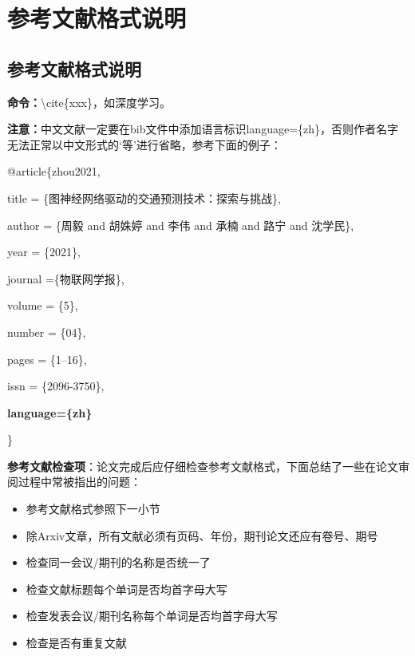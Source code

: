  \setlength{\baselineskip}{20pt}
\chapter{参考文献格式说明}
\label{cha:chap3}


\section{参考文献格式说明}

\textbf{命令：}\textbackslash cite\{xxx\}，如深度学习\cite{lecunDeepLearning2015}。

\textbf{注意：}中文文献一定要在bib文件中添加语言标识language=\{zh\}，否则作者名字无法正常以中文形式的‘等’进行省略，参考下面的例子\cite{zhou2021}：

@article\{zhou2021,
	
	\indent\indent title = \{图神经网络驱动的交通预测技术：探索与挑战\},
	
	\indent\indent author = \{周毅 and 胡姝婷 and 李伟 and 承楠 and 路宁 and 沈学民\},
	
	\indent\indent year = \{2021\},
	
	\indent\indent journal =\{物联网学报\},
	
	\indent\indent volume = \{5\},
	
	\indent\indent number = \{04\},
	
	\indent\indent pages = \{1--16\},
	
	\indent\indent issn = \{2096-3750\},
	
	\indent\indent \textbf{language=\{zh\}}
	
\}


\textbf{参考文献检查项}：论文完成后应仔细检查参考文献格式，下面总结了一些在论文审阅过程中常被指出的问题：

\begin{itemize}
	\item 参考文献格式参照下一小节
	\item 除Arxiv文章，所有文献必须有页码、年份，期刊论文还应有卷号、期号
	\item 检查同一会议/期刊的名称是否统一了
	\item 检查文献标题每个单词是否均首字母大写
	\item 检查发表会议/期刊名称每个单词是否均首字母大写
	\item 检查是否有重复文献
\end{itemize}








